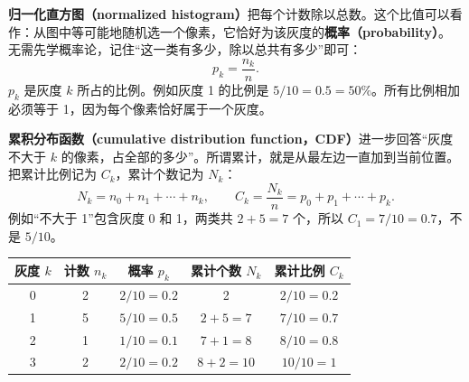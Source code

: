 \textbf{归一化直方图（normalized histogram）}把每个计数除以总数。这个比值可以看作：从图中等可能地随机选一个像素，它恰好为该灰度的\textbf{概率（probability）}。无需先学概率论，记住“这一类有多少，除以总共有多少”即可：
\[
p_k=\frac{n_k}{n}.
\]
$p_k$ 是灰度 $k$ 所占的比例。例如灰度 1 的比例是 $5/10=0.5=50\%$。所有比例相加必须等于 1，因为每个像素恰好属于一个灰度。

\textbf{累积分布函数（cumulative distribution function，CDF）}进一步回答“灰度不大于 $k$ 的像素，占全部的多少”。所谓累计，就是从最左边一直加到当前位置。把累计比例记为 $C_k$，累计个数记为 $N_k$：
\[
N_k=n_0+n_1+\cdots+n_k,\qquad
C_k=\frac{N_k}{n}=p_0+p_1+\cdots+p_k.
\]
例如“不大于 1”包含灰度 0 和 1，两类共 $2+5=7$ 个，所以 $C_1=7/10=0.7$，不是 $5/10$。

\begin{center}
\begin{tabular}{ccccc}
\toprule
灰度 $k$ & 计数 $n_k$ & 概率 $p_k$ & 累计个数 $N_k$ & 累计比例 $C_k$\\
\midrule
0 & 2 & $2/10=0.2$ & 2 & $2/10=0.2$\\
1 & 5 & $5/10=0.5$ & $2+5=7$ & $7/10=0.7$\\
2 & 1 & $1/10=0.1$ & $7+1=8$ & $8/10=0.8$\\
3 & 2 & $2/10=0.2$ & $8+2=10$ & $10/10=1$\\
\bottomrule
\end{tabular}
\end{center}

\begin{center}
\end{center}

